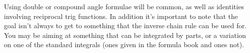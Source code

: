 Using double or compound angle formulae will be common, as well as identities involving reciprocal trig functions. In addition it's important to note that the goal isn't always to get to something that the inverse chain rule can be used for. You may be aiming at something that can be integrated by parts, or a variation on one of the standard integrals (ones given in the formula book and ones not).
